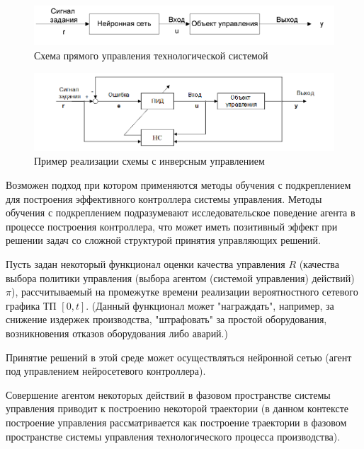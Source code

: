 \begin{figure}[H]
	\includegraphics[scale=0.8]{images/part7/chapter_enterprise/nncontrol_direct.png}
	\caption{Схема прямого управления технологической системой}
	\label{fig:nncontrol_direct}
\end{figure}

\begin{figure}[H]
	\includegraphics[scale=0.8]{images/part7/chapter_enterprise/nncontrol_inverse.png}
	\caption{Пример реализации схемы с инверсным управлением}
	\label{fig:nncontrol_inverse}
\end{figure}

Возможен подход при котором применяются методы обучения с подкреплением для построения эффективного контроллера системы управления. Методы обучения с подкреплением подразумевают исследовательское поведение агента в процессе построения контроллера, что может иметь позитивный эффект при решении задач со сложной структурой принятия управляющих решений.

Пусть задан некоторый функционал оценки качества управления $R$ (качества выбора политики управления (выбора агентом (системой управления) действий) $\pi$), рассчитываемый на промежутке времени реализации вероятностного сетевого графика ТП $[0,t]$. (Данный функционал может "награждать", например, за снижение издержек производства, "штрафовать" за простой оборудования, возникновения отказов оборудования либо аварий.)

Принятие решений в этой среде может осуществляться нейронной сетью (агент под управлением нейросетевого контроллера).

Совершение агентом некоторых действий в фазовом пространстве системы управления приводит к построению некоторой траектории (в данном контексте построение управления рассматривается как построение траектории в фазовом пространстве системы управления технологического процесса производства).


